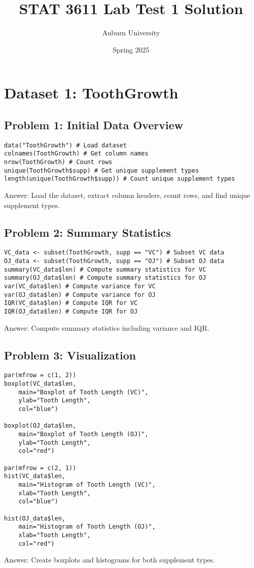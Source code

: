\documentclass[12pt]{article}
\begin{document}
\title{STAT 3611 Lab Test 1 Solution}
\author{Auburn University}
\date{Spring 2025}
\maketitle

\section{Dataset 1: ToothGrowth}

\subsection{Problem 1: Initial Data Overview}
\begin{lstlisting}
data("ToothGrowth") # Load dataset
colnames(ToothGrowth) # Get column names
nrow(ToothGrowth) # Count rows
unique(ToothGrowth$supp) # Get unique supplement types
length(unique(ToothGrowth$supp)) # Count unique supplement types
\end{lstlisting}
Answer: Load the dataset, extract column headers, count rows, and find unique supplement types.

\subsection{Problem 2: Summary Statistics}
\begin{lstlisting}
VC_data <- subset(ToothGrowth, supp == "VC") # Subset VC data
OJ_data <- subset(ToothGrowth, supp == "OJ") # Subset OJ data
summary(VC_data$len) # Compute summary statistics for VC
summary(OJ_data$len) # Compute summary statistics for OJ
var(VC_data$len) # Compute variance for VC
var(OJ_data$len) # Compute variance for OJ
IQR(VC_data$len) # Compute IQR for VC
IQR(OJ_data$len) # Compute IQR for OJ
\end{lstlisting}
Answer: Compute summary statistics including variance and IQR.

\subsection{Problem 3: Visualization}
\begin{lstlisting}
par(mfrow = c(1, 2))
boxplot(VC_data$len, 
    main="Boxplot of Tooth Length (VC)",
    ylab="Tooth Length",
    col="blue")

boxplot(OJ_data$len, 
    main="Boxplot of Tooth Length (OJ)",
    ylab="Tooth Length",
    col="red")

par(mfrow = c(2, 1))
hist(VC_data$len, 
    main="Histogram of Tooth Length (VC)",
    xlab="Tooth Length",
    col="blue")

hist(OJ_data$len, 
    main="Histogram of Tooth Length (OJ)",
    xlab="Tooth Length",
    col="red")
\end{lstlisting}
Answer: Create boxplots and histograms for both supplement types.
\end{document}
